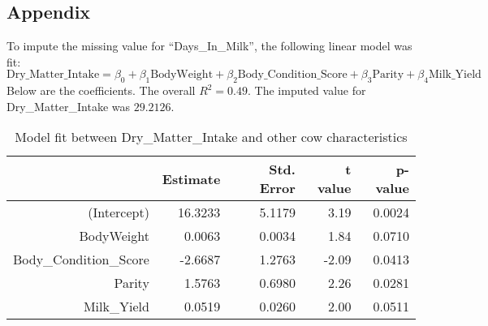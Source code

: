 \documentclass[12pt]{article}
\begin{document}
\newpage
\begin{appendix}
\section*{Appendix} \label{Appendix}
To impute the missing value for ``Days\_In\_Milk'', the following linear model was fit:
\[ \text{Dry\_Matter\_Intake} = \beta_0 + \beta_1 \text{BodyWeight} + \beta_2 \text{Body\_Condition\_Score} + \beta_3 \text{Parity} + \beta_4 \text{Milk\_Yield}  \]
Below are the coefficients. The overall $R^2 = 0.49$. The imputed value for Dry\_Matter\_Intake was $29.2126$. 
\begin{table}[ht]
\centering
\begin{tabular}{rrrrr}
  \hline
  & Estimate & Std. Error & t value & p-value \\ 
  \hline
 (Intercept) & 16.3233 & 5.1179 & 3.19 & 0.0024 \\ 
  BodyWeight & 0.0063 & 0.0034 & 1.84 & 0.0710 \\ 
  Body\_Condition\_Score & -2.6687 & 1.2763 & -2.09 & 0.0413 \\ 
  Parity & 1.5763 & 0.6980 & 2.26 & 0.0281 \\ 
  Milk\_Yield & 0.0519 & 0.0260 & 2.00 & 0.0511 \\ 
  \hline
\end{tabular}
\caption{Model fit between Dry\_Matter\_Intake and other cow characteristics}
\end{table}
\end{appendix}
\end{document}

